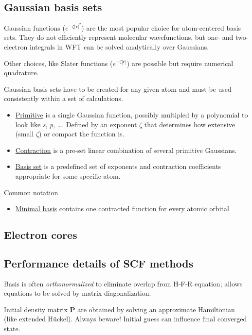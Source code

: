 \documentclass[11pt]{article}
\begin{document}
\subsection{Gaussian basis sets}
\label{sec:orga7aade1}
Gaussian functions (\(e^{-\zeta|\mathbf{r}|^2}\)) are the most popular choice for atom-centered basis sets.  They do not efficiently represent molecular wavefunctions, but one- and two-electron integrals in  WFT  can be solved analytically over Gaussians.

Other choices, like Slater functions (\(e^{-\zeta|\mathbf{r}|}\)) are possible but require numerical quadrature.

Gaussian basis sets have to be created for any given atom and must be used consistently within a set of calculations.

\begin{itemize}
\item \uline{Primitive} is a single Gaussian function, possibly multipled by a polynomial to look like
\emph{s}, \emph{p}, \ldots.  Defined by an exponent \(\zeta\) that determines how extensive (small \(\zeta\)) or compact
the function is.
\item \uline{Contraction} is a pre-set linear combination of several primitive Gaussians.
\item \uline{Basis set} is a predefined set of exponents and contraction coefficients appropriate
for some specific atom.
\end{itemize}

Common notation
\begin{itemize}
\item \uline{Minimal basis} contains one contracted function for every atomic orbital
\end{itemize}

\subsection{Electron cores}
\label{sec:org81bd13d}

\subsection{Performance details of SCF methods}
\label{sec:org25ff7c7}
Basis is often \emph{orthonormalized} to eliminate overlap from H-F-R equation; allows equations to be solved by matrix diagonalization.

Initial density matrix \(\mathbf{P}\) are obtained by solving an approximate Hamiltonian (like
extended H\"{u}ckel). Always beware! Initial guess can influence final converged state.
\end{document}
